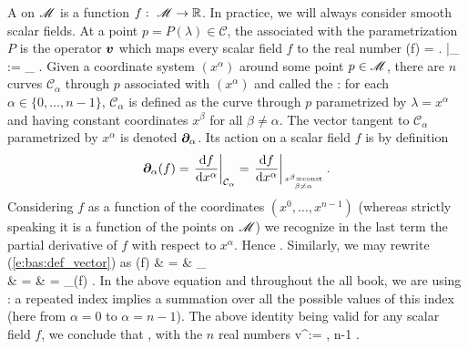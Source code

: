 A  on $\mathscr{M}$ is a function
$f:\ \mathscr{M} \rightarrow \mathbb{R}$. In practice, we will always consider smooth scalar fields. At a point $p=P(\lambda)\in\mathcal{C}$, the  associated with the parametrization
$P$ is the operator $\bm{v}$ which maps every scalar field $f$ to the real number
\be \label{e:bas:def_vector}
  (f) = \left.  \right|_{} :=
  \lim_{\varepsilon{}} 
   .
\ee
Given a coordinate system $(x^\alpha)$ around some point $p\in\mathscr{M}$, there are
$n$ curves $\mathcal{C}_\alpha$ through $p$ associated with $(x^\alpha)$ and called the
:
for each $\alpha\in\{0,\ldots,n-1\}$, $\mathcal{C}_\alpha$ is defined as the curve through $p$ parametrized by $\lambda = x^\alpha$ and having constant coordinates
$x^\beta$ for all $\beta\not=\alpha$.
The vector tangent to $\mathcal{C}_\alpha$ parametrized by $x^\alpha$ is
denoted $\bm{\partial}_\alpha$. Its action on a scalar field $f$ is by definition
\[
  \bm{\partial}_\alpha(f) =
  \left. \frac{\mathrm{d} f}{\mathrm{d} x^\alpha} \right|_{\mathcal{C}_\alpha}
  = \left. \frac{\mathrm{d} f}{\mathrm{d} x^\alpha} \right|_{x^\beta={\rm const}\atop \beta\not=\alpha} .
\]
Considering $f$ as a function of
the coordinates $(x^0,\ldots,x^{n-1})$ (whereas strictly speaking it is a function
of the points on $\mathscr{M}$) we recognize in the last term the partial derivative of
$f$ with respect to $x^\alpha$. Hence
\be \label{e:bas:wpar_partial}
  .
\ee
Similarly, we may rewrite (\ref{e:bas:def_vector}) as
\bea
  (f) & = & \lim_{\varepsilon{}} 
   \nonumber \\
  & = &  
  = \wpar_\alpha(f)  . \nonumber
\eea
In the above equation and throughout the all book,
we are using : a repeated index implies a summation over all the possible values of this index
(here from $\alpha=0$ to $\alpha=n-1$).
The above identity being valid for any scalar field $f$, we conclude that
\be \label{e:bas:v_va_wpar_a}
   ,
\ee
with the $n$ real numbers
\be
  v^\alpha :=  ,  \leq \alpha\leq n-1 .
